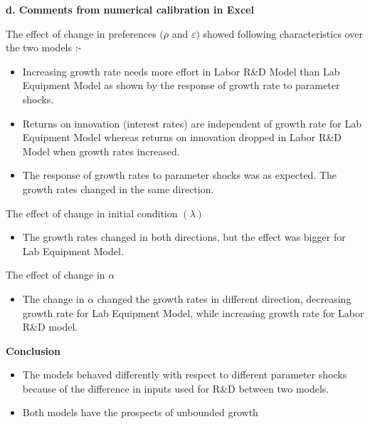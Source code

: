 \documentclass[a4paper, 12pt]{article}
\begin{document}
\begin{flushleft}
	\textbf{d. Comments from numerical calibration in Excel}
		\begin{flushleft}
			The effect of change in preferences $ (\rho $ and $ \varepsilon) $ showed following characteristics over the two models :-
		\end{flushleft}
		\begin{flushleft}
			\begin{itemize}
				\item Increasing growth rate needs more effort in Labor R\&D Model than Lab Equipment Model as shown by the response of growth rate to parameter shocks.
			\end{itemize}
			\begin{itemize}
				\item Returns on innovation (interest rates) are independent of growth rate for Lab Equipment Model whereas returns on innovation dropped in Labor R\&D Model when growth rates increased.
			\end{itemize}
			\begin{itemize}
				\item The response of growth rates to parameter shocks was as expected. The growth rates changed in the same direction.
			\end{itemize}
		\end{flushleft}
		\begin{flushleft}
			The effect of change in initial condition $(\lambda)$
			\begin{itemize}
				\item The growth rates changed in both directions, but the effect was bigger for Lab Equipment Model.
			\end{itemize}
		\end{flushleft}
		\begin{flushleft}
			The effect of change in $ \alpha $
			\begin{itemize}
				\item The change in $ \alpha $ changed the growth rates in different direction, decreasing growth rate for Lab Equipment Model, while increasing growth rate for Labor R\&D model.
			\end{itemize}
		\end{flushleft}
\end{flushleft}
\newpage
\begin{flushleft}
	\textbf{Conclusion}
	\begin{flushleft}
		\begin{itemize}
			\item The models behaved differently with respect to different parameter shocks because of the difference in inputs used for R\&D between two models.
			\item Both models have the prospects of unbounded growth 
		\end{itemize}
	\end{flushleft}
\end{flushleft}
\end{document}
